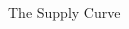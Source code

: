 \documentclass[9pt]{beamer}
\begin{document}
\begin{frame}{The Supply Curve}
\begin{columns}[c]
\begin{column}{0.5\textwidth}
    \end{column}
\end{columns}
\end{frame}


\end{document}
